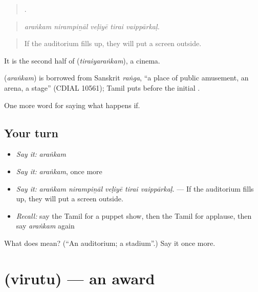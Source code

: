 \begin{quote}
    .
\end{quote}

\begin{quote}
\emph{araṅkam nirampiṉāl veḷiyē tirai vaippārkaḷ.}
\end{quote}

\begin{quote}
If the auditorium fills up, they will put a screen outside.
\end{quote}

It is the second half of  (\emph{tiraiyaraṅkam}), a cinema.

\begin{cousinweb}
\textbf{} (\emph{araṅkam}) is borrowed from Sanskrit \emph{raṅga}, \textquotedblleft{}a place of public amusement, an arena, a stage\textquotedblright{} (CDIAL 10561); Tamil puts  before the initial .
\end{cousinweb}

\begin{grammarlens}[title={What you've built}]
One more word for saying what happens if.
\end{grammarlens}

\subsection*{Your turn}
\begin{itemize}
\raggedright
  \item \emph{Say it:} \emph{araṅkam}
  \item \emph{Say it:} \emph{araṅkam}, once more
  \item \emph{Say it:} \emph{araṅkam nirampiṉāl veḷiyē tirai vaippārkaḷ.} — If the auditorium fills up, they will put a screen outside.
  \item \emph{Recall:} say the Tamil for a puppet show, then the Tamil for applause, then say \emph{araṅkam} again
\end{itemize}

\begin{tcolorbox}[breakable,colback=teal!4,colframe=teal!35!black,title={Before you move on}]
What does  mean? (\textquotedblleft{}An auditorium; a stadium\textquotedblright{}.) Say it once more.
\end{tcolorbox}
\section[\texorpdfstring{\ta{விருது} (virutu)}{விருது (virutu)}]{ (virutu) — an award}

